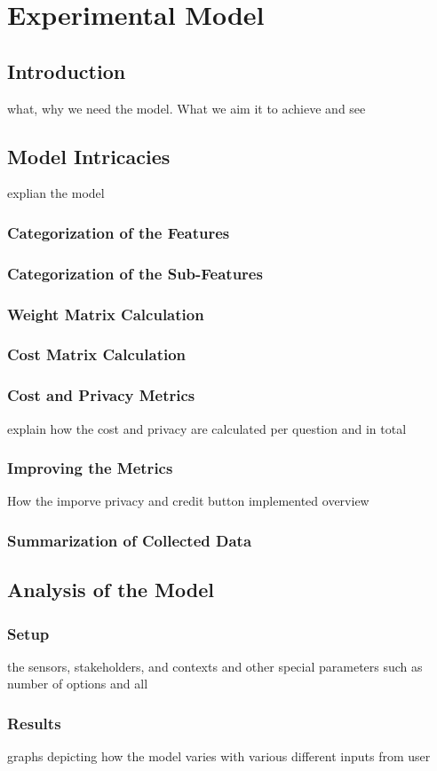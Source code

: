 \chapter{Experimental Model}

\section{Introduction}
what, why we need the model. What we aim it to achieve and see

\section{Model Intricacies}
explian the model

\subsection{Categorization of the Features}

\subsection{Categorization of the Sub-Features}

\subsection{Weight Matrix Calculation}

\subsection{Cost Matrix Calculation}

\subsection{Cost and Privacy Metrics}
explain how the cost and privacy are calculated per question and in total

\subsection{Improving the Metrics}
How the imporve privacy and credit button implemented overview

\subsection{Summarization of Collected Data}

\section{Analysis of the Model}

\subsection{Setup}
the sensors, stakeholders, and contexts and other special parameters such as number of options and all

\subsection{Results}
graphs depicting how the model varies with various different inputs from user










